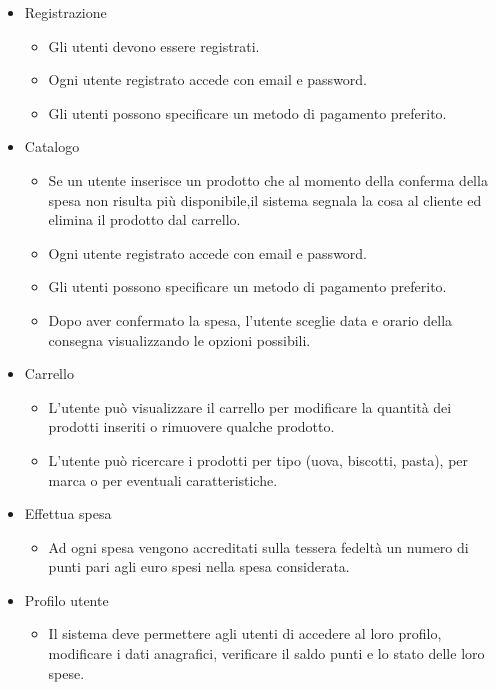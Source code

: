 \documentclass[12pt, a4paper]{report}
\begin{document}
\begin{itemize}
  \item Registrazione
    \begin{itemize}
      \item Gli  utenti devono  essere  registrati.
      \item Ogni utente registrato accede con email e password.
      \item Gli utenti possono specificare un metodo di pagamento preferito.
    \end{itemize}
  \item Catalogo
    \begin{itemize}
      \item  Se un utente inserisce un prodotto che al momento della conferma 
        della spesa non risulta più disponibile,il sistema segnala la cosa al 
        cliente ed elimina il prodotto dal carrello.
      \item Ogni utente registrato accede con email e password.
      \item Gli utenti possono specificare un metodo di pagamento preferito.
      \item Dopo aver confermato la spesa, l’utente sceglie data e orario della
        consegna visualizzando le opzioni possibili.
    \end{itemize}
  \item Carrello
    \begin{itemize}
      \item L’utente può visualizzare il carrello per modificare la quantità dei 
        prodotti inseriti o rimuovere qualche prodotto.
      \item L’utente può ricercare i prodotti per tipo (uova, biscotti, pasta),
        per marca o per eventuali caratteristiche.
    \end{itemize}
  \item Effettua spesa
    \begin{itemize}
      \item  Ad ogni spesa vengono accreditati sulla tessera fedeltà un numero di 
        punti pari agli euro spesi nella spesa considerata.
    \end{itemize}
  \item Profilo utente
    \begin{itemize}
      \item  Il  sistema  deve  permettere  agli  utenti  di  accedere  al  loro
        profilo,  modificare  i  dati  anagrafici, verificare il saldo punti e 
        lo stato delle loro spese.

\end{itemize}
\end{itemize}
\end{document}
